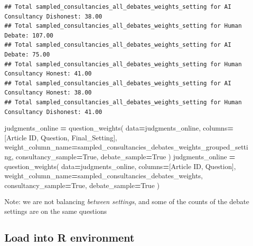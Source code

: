 \documentclass[
]{article}
\newenvironment{Shaded}{\begin{snugshade}}{\end{snugshade}}
\newcommand{\NormalTok}[1]{#1}
\newcommand{\OperatorTok}[1]{\textcolor[rgb]{0.81,0.36,0.00}{\textbf{#1}}}
\newcommand{\StringTok}[1]{\textcolor[rgb]{0.31,0.60,0.02}{#1}}
\newcommand{\VariableTok}[1]{\textcolor[rgb]{0.00,0.00,0.00}{#1}}
\begin{document}
\begin{verbatim}
## Total sampled_consultancies_all_debates_weights_setting for AI Consultancy Dishonest: 38.00
## Total sampled_consultancies_all_debates_weights_setting for Human Debate: 107.00
## Total sampled_consultancies_all_debates_weights_setting for AI Debate: 75.00
## Total sampled_consultancies_all_debates_weights_setting for Human Consultancy Honest: 41.00
## Total sampled_consultancies_all_debates_weights_setting for AI Consultancy Honest: 38.00
## Total sampled_consultancies_all_debates_weights_setting for Human Consultancy Dishonest: 41.00
\end{verbatim}

\begin{Shaded}
\begin{Highlighting}[]

\NormalTok{judgments\_online }\OperatorTok{=}\NormalTok{ question\_weights(}
\NormalTok{    data}\OperatorTok{=}\NormalTok{judgments\_online, }
\NormalTok{    columns}\OperatorTok{=}\NormalTok{[}\StringTok{\textquotesingle{}Article ID\textquotesingle{}}\NormalTok{, }\StringTok{\textquotesingle{}Question\textquotesingle{}}\NormalTok{, }\StringTok{\textquotesingle{}Final\_Setting\textquotesingle{}}\NormalTok{], }
\NormalTok{    weight\_column\_name}\OperatorTok{=}\StringTok{\textquotesingle{}sampled\_consultancies\_debates\_weights\_grouped\_setting\textquotesingle{}}\NormalTok{,}
\NormalTok{    consultancy\_sample}\OperatorTok{=}\VariableTok{True}\NormalTok{,}
\NormalTok{    debate\_sample}\OperatorTok{=}\VariableTok{True}
\NormalTok{)}
\NormalTok{judgments\_online }\OperatorTok{=}\NormalTok{ question\_weights(}
\NormalTok{    data}\OperatorTok{=}\NormalTok{judgments\_online, }
\NormalTok{    columns}\OperatorTok{=}\NormalTok{[}\StringTok{\textquotesingle{}Article ID\textquotesingle{}}\NormalTok{, }\StringTok{\textquotesingle{}Question\textquotesingle{}}\NormalTok{], }
\NormalTok{    weight\_column\_name}\OperatorTok{=}\StringTok{\textquotesingle{}sampled\_consultancies\_debates\_weights\textquotesingle{}}\NormalTok{,}
\NormalTok{    consultancy\_sample}\OperatorTok{=}\VariableTok{True}\NormalTok{,}
\NormalTok{    debate\_sample}\OperatorTok{=}\VariableTok{True}
\NormalTok{)}
\end{Highlighting}
\end{Shaded}

Note: we are not balancing \emph{between settings}, and some of the
counts of the debate settings are on the same questions

\hypertarget{load-into-r-environment}{%
\subsection{Load into R environment}\label{load-into-r-environment}}
\end{document}
